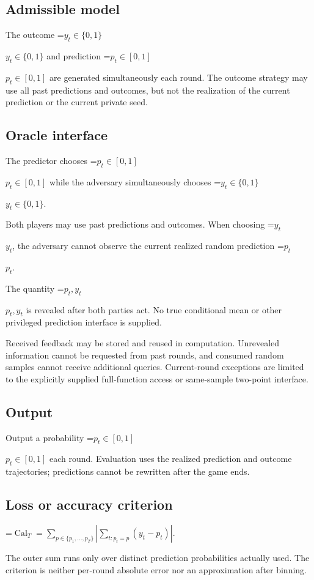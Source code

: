 \documentclass[10pt,a4paper]{article}
\newcommand{\AtlasMath}[1]{\par\begingroup\centering\setbox0=\hbox{$\displaystyle #1$}\ifdim\wd0>1.4\linewidth\typeout{ATLAS WIDE FORMULA: \the\wd0}\fi\ifdim\wd0>\linewidth\resizebox{\linewidth}{!}{\box0}\else\box0\fi\par\endgroup}
\newcommand{\AtlasInlineMath}[1]{\begingroup\setbox0=\hbox{$#1$}\ifdim\wd0>.4\linewidth\endgroup\AtlasMath{#1}\else\endgroup$#1$\fi}
\begin{document}
\subsection{Admissible model}
The outcome \AtlasInlineMath{y_t\in\{0,1\}} and prediction \AtlasInlineMath{p_t\in[0,1]} are generated simultaneously each round. The outcome strategy may use all past predictions and outcomes, but not the realization of the current prediction or the current private seed.

\subsection{Oracle interface}
The predictor chooses \AtlasInlineMath{p_t\in[0,1]} while the adversary simultaneously chooses \AtlasInlineMath{y_t\in\{0,1\}}.

Both players may use past predictions and outcomes. When choosing \AtlasInlineMath{y_t}, the adversary cannot observe the current realized random prediction \AtlasInlineMath{p_t}.

The quantity \AtlasInlineMath{p_t,y_t} is revealed after both parties act. No true conditional mean or other privileged prediction interface is supplied.

Received feedback may be stored and reused in computation. Unrevealed information cannot be requested from past rounds, and consumed random samples cannot receive additional queries. Current-round exceptions are limited to the explicitly supplied full-function access or same-sample two-point interface.

\subsection{Output}
Output a probability \AtlasInlineMath{p_t\in[0,1]} each round. Evaluation uses the realized prediction and outcome trajectories; predictions cannot be rewritten after the game ends.

\subsection{Loss or accuracy criterion}

\AtlasMath{\operatorname{Cal}_T=\sum_{p\in\{p_1,\ldots,p_T\}}\left|\sum_{t:p_t=p}(y_t-p_t)\right|.}


The outer sum runs only over distinct prediction probabilities actually used. The criterion is neither per-round absolute error nor an approximation after binning.
\end{document}
